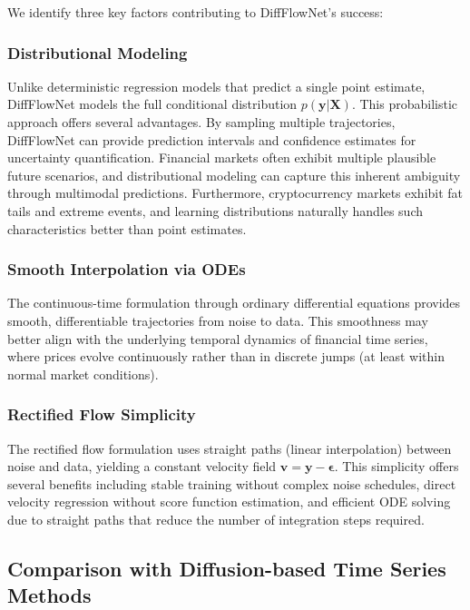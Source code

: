 \documentclass[11pt,a4paper]{article}
\begin{document}
We identify three key factors contributing to DiffFlowNet's success:

\subsubsection{Distributional Modeling}

Unlike deterministic regression models that predict a single point estimate, DiffFlowNet models the full conditional distribution $p(\mathbf{y}|\mathbf{X})$. This probabilistic approach offers several advantages. By sampling multiple trajectories, DiffFlowNet can provide prediction intervals and confidence estimates for uncertainty quantification. Financial markets often exhibit multiple plausible future scenarios, and distributional modeling can capture this inherent ambiguity through multimodal predictions. Furthermore, cryptocurrency markets exhibit fat tails and extreme events, and learning distributions naturally handles such characteristics better than point estimates.

\subsubsection{Smooth Interpolation via ODEs}

The continuous-time formulation through ordinary differential equations provides smooth, differentiable trajectories from noise to data. This smoothness may better align with the underlying temporal dynamics of financial time series, where prices evolve continuously rather than in discrete jumps (at least within normal market conditions).

\subsubsection{Rectified Flow Simplicity}

The rectified flow formulation \cite{liu2023rectified} uses straight paths (linear interpolation) between noise and data, yielding a constant velocity field $\mathbf{v} = \mathbf{y} - \boldsymbol{\epsilon}$. This simplicity offers several benefits including stable training without complex noise schedules, direct velocity regression without score function estimation, and efficient ODE solving due to straight paths that reduce the number of integration steps required.

\subsection{Comparison with Diffusion-based Time Series Methods}
\end{document}
